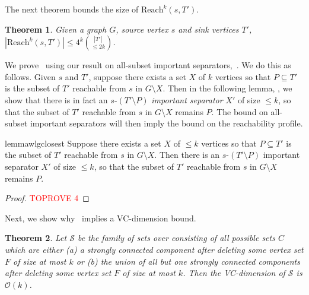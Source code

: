 \documentclass[11pt]{article}
\newtheorem{theorem}{Theorem}[section]
\newif\iflongversion
\newcommand{\lv}[1]{\iflongversion #1 \fi}  \newcommand{\sv}[1]{\iflongversion\else #1\fi}
\newcommand{\Reach}{\mathrm{Reach}\xspace}
\renewcommand{\SS}{\mathcal{S}}
\newcommand{\OO}{\mathcal{O}}
\begin{document}
The next theorem bounds the size of $\Reach^k(s, T')$. 

\begin{theorem}\label{thm:reachability}
Given a graph $G$, source vertex $s$ and sink vertices $T'$, $|\Reach^k(s, T')| \leq 4^k {|T'| \choose \leq 2k}$.
\end{theorem}

We prove~ using our result on all-subset important separators,~. We do this as follows. Given $s$ and $T'$, suppose there exists a set $X$ of $k$ vertices so that $P \subseteq T'$ is the subset of $T'$ reachable from $s$ in $G \setminus X$. Then in the following lemma, , we show that there is in fact an $s$-$(T' \setminus P)$ \emph{important separator} $X'$ of size $\leq k$, so that the subset of $T'$ reachable from $s$ in $G \setminus X$ remains $P$. The bound on all-subset important separators will then imply the bound on the reachability profile.  

\begin{restatable}{lemma}{wlgclosest}\label{lemma:wlgclosest}
Suppose there exists a set $X$ of $\leq k$ vertices so that $P \subseteq T'$ is the subset of $T'$ reachable from $s$ in $G \setminus X$. Then there is an $s$-$(T' \setminus P)$ important separator $X'$ of size $\leq k$, so that the subset of $T'$ reachable from $s$ in $G \setminus X$ remains $P$.
\end{restatable}
\lv{
\begin{proof}\textcolor{red}{TOPROVE 3}\end{proof}
}

\begin{proof}\textcolor{red}{TOPROVE 4}\end{proof}





Next, we show why~ implies a VC-dimension bound.

\begin{theorem}
Let $\SS$ be the family of sets over consisting of all possible sets $C$ which are either (a) a strongly connected component after deleting some vertex set $F$ of size at most $k$ or (b) the union of all but one strongly connected components after deleting some vertex set $F$ of size at most $k$. Then the VC-dimension of $\SS$ is $\OO(k)$.
\end{theorem}
\end{document}
